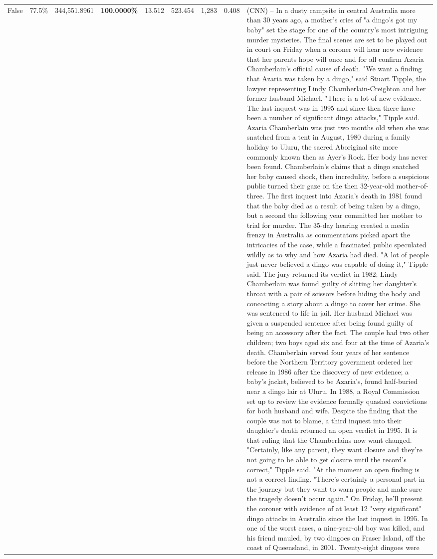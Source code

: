 \begin{table}[H]
\begin{tabular}{lllrlllll}
False & 77.5\% & 344,551.8961 & \bfseries \color{red} 100.0000\% & 13.512 & 523.454 & 1,283 & 0.408 & (CNN) -- In a dusty campsite in central Australia more than 30 years ago, a mother's cries of "a dingo's got my baby" set the stage for one of the country's most intriguing murder mysteries. The final scenes are set to be played out in court on Friday when a coroner will hear new evidence that her parents hope will once and for all confirm Azaria Chamberlain's official cause of death. "We want a finding that Azaria was taken by a dingo," said Stuart Tipple, the lawyer representing Lindy Chamberlain-Creighton and her former husband Michael. "There is a lot of new evidence. The last inquest was in 1995 and since then there have been a number of significant dingo attacks," Tipple said. Azaria Chamberlain was just two months old when she was snatched from a tent in August, 1980 during a family holiday to Uluru, the sacred Aboriginal site more commonly known then as Ayer's Rock. Her body has never been found. Chamberlain's claims that a dingo snatched her baby caused shock, then incredulity, before a suspicious public turned their gaze on the then 32-year-old mother-of-three. The first inquest into Azaria's death in 1981 found that the baby died as a result of being taken by a dingo, but a second the following year committed her mother to trial for murder. The 35-day hearing created a media frenzy in Australia as commentators picked apart the intricacies of the case, while a fascinated public speculated wildly as to why and how Azaria had died. "A lot of people just never believed a dingo was capable of doing it," Tipple said. The jury returned its verdict in 1982; Lindy Chamberlain was found guilty of slitting her daughter's throat with a pair of scissors before hiding the body and concocting a story about a dingo to cover her crime. She was sentenced to life in jail. Her husband Michael was given a suspended sentence after being found guilty of being an accessory after the fact. The couple had two other children; two boys aged six and four at the time of Azaria's death. Chamberlain served four years of her sentence before the Northern Territory government ordered her release in 1986 after the discovery of new evidence; a baby's jacket, believed to be Azaria's, found half-buried near a dingo lair at Uluru. In 1988, a Royal Commission set up to review the evidence formally quashed convictions for both husband and wife. Despite the finding that the couple was not to blame, a third inquest into their daughter's death returned an open verdict in 1995. It is that ruling that the Chamberlains now want changed. "Certainly, like any parent, they want closure and they're not going to be able to get closure until the record's correct," Tipple said. "At the moment an open finding is not a correct finding. "There's certainly a personal part in the journey but they want to warn people and make sure the tragedy doesn't occur again." On Friday, he'll present the coroner with evidence of at least 12 "very significant" dingo attacks in Australia since the last inquest in 1995. In one of the worst cases, a nine-year-old boy was killed, and his friend mauled, by two dingoes on Fraser Island, off the coast of Queensland, in 2001. Twenty-eight dingoes were 
\end{tabular}
\end{table}
